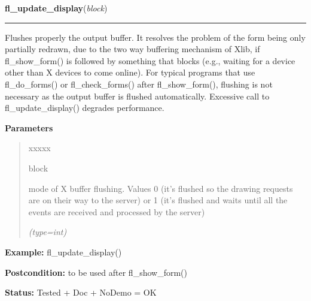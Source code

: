     \label{xformslib:flxbasic:fl_update_display}

    \vspace{0.5ex}

\hspace{.8\funcindent}\begin{boxedminipage}{\funcwidth}

    \raggedright \textbf{fl\_update\_display}(\textit{block})

    \vspace{-1.5ex}

    \rule{\textwidth}{0.5\fboxrule}
\setlength{\parskip}{2ex}
    Flushes properly the output buffer. It resolves the problem of the form
    being only partially redrawn, due to the two way buffering mechanism of
    Xlib, if fl\_show\_form() is followed by something that blocks (e.g., 
    waiting for a device other than X devices to come online). For typical 
    programs that use fl\_do\_forms() or fl\_check\_forms() after 
    fl\_show\_form(), flushing is not necessary as the output buffer is 
    flushed automatically. Excessive call to fl\_update\_display() degrades
    performance.

\setlength{\parskip}{1ex}
      \textbf{Parameters}
      \vspace{-1ex}

      \begin{quote}
        \begin{Ventry}{xxxxx}

          \item[block]

          mode of X buffer flushing. Values 0 (it's flushed so the drawing 
          requests are on their way to the server) or 1 (it's flushed and 
          waits until all the events are received and processed by the 
          server)

            {\it (type=int)}

        \end{Ventry}

      \end{quote}

\textbf{Example:} fl\_update\_display()



\textbf{Postcondition:} to be used after fl\_show\_form()



\textbf{Status:} Tested + Doc + NoDemo = OK



    \end{boxedminipage}

